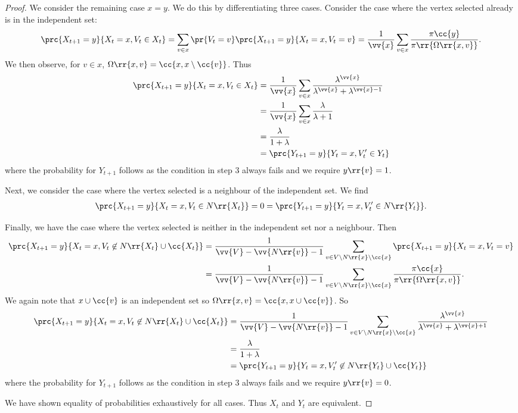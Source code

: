 \documentclass{article}
\begin{document}
\begin{claim*}[1]
\begin{proof}
    We consider the remaining case $x=y$. We do this by differentiating three cases.
    Consider the case where the vertex selected already is in the independent set:
    \begin{align*}
      \prc{X_{t+1}=y}{X_t=x, V_t\in X_t}
      = \sum_{v\in x} \pr{V_t=v} \prc{X_{t+1}=y}{X_t=x, V_t=v}
      = \frac{1}{\vv{x}}\sum_{v\in x} \frac{\pi\cc{y}}{\pi\rr{\Omega\rr{x,v}}}.
    \end{align*}
    We then observe, for $v\in x$, $\Omega\rr{x,v}=\cc{x,x\setminus\cc{v}}$. Thus
    \begin{align*}
      \prc{X_{t+1}=y}{X_t=x, V_t\in X_t} &= \frac{1}{\vv{x}}\sum_{v\in x} \frac{\lambda^{\vv{x}}}{\lambda^{\vv{x}}+\lambda^{\vv{x}-1}} \\
                                         &= \frac{1}{\vv{x}}\sum_{v\in x} \frac{\lambda}{\lambda+1} \\
                                         &= \frac{\lambda}{1+\lambda}  \\
                                         &= \prc{Y_{t+1}=y}{Y_t=x, V'_t\in Y_t}
    \end{align*}
    where the probability for $Y_{t+1}$ follows as the condition in step 3 always fails and we require $y\rr{v}=1$.

    Next, we consider the case where the vertex selected is a neighbour of the independent set.
    We find
    \begin{align*}
      \prc{X_{t+1}=y}{X_t=x, V_t\in N\rr{X_t}} = 0 = \prc{Y_{t+1}=y}{Y_t=x, V'_t\in N\rr{Y_t}}.
    \end{align*}

    Finally, we have the case where the vertex selected is neither in the independent set
    nor a neighbour. Then
    \begin{align*}
      \prc{X_{t+1}=y}{X_t=x, V_t\not\in N\rr{X_t}\cup \cc{X_t}}
      &= \frac{1}{\vv{V}-\vv{N\rr{v}}-1}\sum_{v\in V\setminus N\rr{x}\setminus\cc{x}} \prc{X_{t+1}=y}{X_t=x, V_t=v} \\
      &= \frac{1}{\vv{V}-\vv{N\rr{v}}-1}\sum_{v\in V\setminus N\rr{x}\setminus\cc{x}} \frac{\pi\cc{x}}{\pi\rr{\Omega\rr{x,v}}}.
    \end{align*}
    We again note that $x\cup\cc{v}$ is an independent set so $\Omega\rr{x,v}=\cc{x,x\cup\cc{v}}$. So
    \begin{align*}
      \prc{X_{t+1}=y}{X_t=x, V_t\not\in N\rr{X_t}\cup \cc{X_t}}
      &= \frac{1}{\vv{V}-\vv{N\rr{v}}-1}\sum_{v\in V\setminus N\rr{x}\setminus\cc{x}} \frac{\lambda^{\vv{x}}}{\lambda^{\vv{x}}+\lambda^{\vv{x}+1}} \\
      &= \frac{\lambda}{1+\lambda} \\
      &= \prc{Y_{t+1}=y}{Y_t=x, V'_t\not\in N\rr{Y_t}\cup \cc{Y_t}}
    \end{align*}
    where the probability for $Y_{t+1}$ follows as the condition in step 3 always fails and we require $y\rr{v}=0$.

    We have shown equality of probabilities exhaustively for all cases. Thus $X_t$ and $Y_t$ are
    equivalent.
  \end{proof}
\end{claim*}
\end{document}
